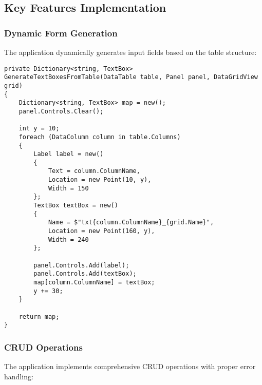 \documentclass[a4paper,12pt]{article}
\begin{document}
\subsection{Key Features Implementation}

\subsubsection{Dynamic Form Generation}
The application dynamically generates input fields based on the table structure:

\begin{lstlisting}[language=CSharp, caption=Dynamic Form Generation]
private Dictionary<string, TextBox> GenerateTextBoxesFromTable(DataTable table, Panel panel, DataGridView grid)
{
    Dictionary<string, TextBox> map = new();
    panel.Controls.Clear();

    int y = 10;
    foreach (DataColumn column in table.Columns)
    {
        Label label = new()
        {
            Text = column.ColumnName,
            Location = new Point(10, y),
            Width = 150
        };
        TextBox textBox = new()
        {
            Name = $"txt{column.ColumnName}_{grid.Name}",
            Location = new Point(160, y),
            Width = 240
        };

        panel.Controls.Add(label);
        panel.Controls.Add(textBox);
        map[column.ColumnName] = textBox;
        y += 30;
    }

    return map;
}
\end{lstlisting}

\subsubsection{CRUD Operations}
The application implements comprehensive CRUD operations with proper error handling:
\end{document}
